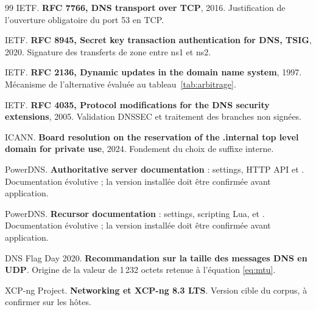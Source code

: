 \begin{thebibliography}{99}
 IETF. \textbf{RFC 7766, DNS transport over TCP}, 2016.
  Justification de l'ouverture obligatoire du port 53 en TCP.

 IETF. \textbf{RFC 8945, Secret key transaction authentication
  for DNS, TSIG}, 2020. Signature des transferts de zone entre ns1 et ns2.

 IETF. \textbf{RFC 2136, Dynamic updates in the domain name
  system}, 1997. Mécanisme de l'alternative évaluée au
  tableau~\ref{tab:arbitrage}.

 IETF. \textbf{RFC 4035, Protocol modifications for the DNS
  security extensions}, 2005. Validation DNSSEC et traitement des branches non
  signées.

 ICANN. \textbf{Board resolution on the reservation of the
  .internal top level domain for private use}, 2024. Fondement du choix de
  suffixe interne.

 PowerDNS. \textbf{Authoritative server documentation} :
  settings, HTTP API et . Documentation évolutive ; la version
  installée doit être confirmée avant application.

 PowerDNS. \textbf{Recursor documentation} : settings,
  scripting Lua,  et . Documentation évolutive ; la
  version installée doit être confirmée avant application.

 DNS Flag Day 2020. \textbf{Recommandation sur la taille des
  messages DNS en UDP}. Origine de la valeur de 1\,232 octets retenue à
  l'équation \eqref{eq:mtu}.

 XCP-ng Project. \textbf{Networking et XCP-ng 8.3 LTS}. Version
  cible du corpus, à confirmer sur les hôtes.

\end{thebibliography}
